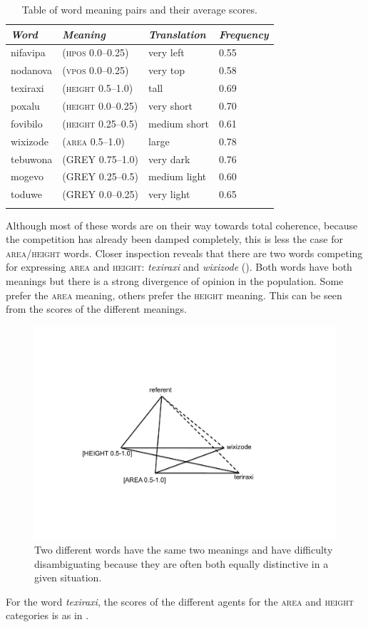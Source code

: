 \begin{table}[t]
\begin{center}
\begin{tabular}{ l  l  l  l }
\lsptoprule
{\itshape Word}&{\itshape Meaning}& {\itshape Translation} & {\itshape Frequency} \\ \midrule
nifavipa & (\textsc{hpos} 0.0–0.25) & very left & 0.55 \\ 
nodanova & (\textsc{vpos} 0.0–0.25) & very top & 0.58  \\ 
texiraxi & (\textsc{height} 0.5–1.0) & tall & 0.69  \\ 
poxalu & (\textsc{height} 0.0–0.25) & very short & 0.70  \\ 
fovibilo & (\textsc{height} 0.25–0.5) & medium short & 0.61  \\ 
wixizode & (\textsc{area} 0.5–1.0) & large & 0.78  \\ 
tebuwona & (GREY 0.75–1.0) & very dark & 0.76  \\ 
mogevo & (GREY 0.25–0.5) & medium light & 0.60  \\ 
toduwe & (GREY 0.0–0.25) & very light & 0.65  \\ 
\lspbottomrule
\end{tabular}
\caption{\label{tab:freq}Table of word meaning pairs and their average scores.}
\end{center}
\end{table}
Although most of these words are on their way towards
total coherence, because the competition has already 
been damped completely, this is less the case for 
\textsc{area}/\textsc{height} words. Closer inspection reveals that 
there are two words competing for expressing
\textsc{area} and \textsc{height}: \textit{texiraxi} and \textit{wixizode}
(). Both words have both meanings
but there is a strong divergence of opinion in the 
population. Some prefer the \textsc{area} meaning, others prefer
the \textsc{height} meaning. This can be seen from the scores of 
the different meanings.


\begin{figure}[t]
  \centerline{\includegraphics[width=.60\textwidth]{chap6/figs/triangle7.pdf}}
\caption{\label{triangle7}Two different words have the 
same two meanings and have difficulty disambiguating because
they are often both equally distinctive in a given situation.}
\end{figure}
For the word \textit{texiraxi}, the scores of the different 
agents for the \textsc{area} and \textsc{height} categories is as in . 


